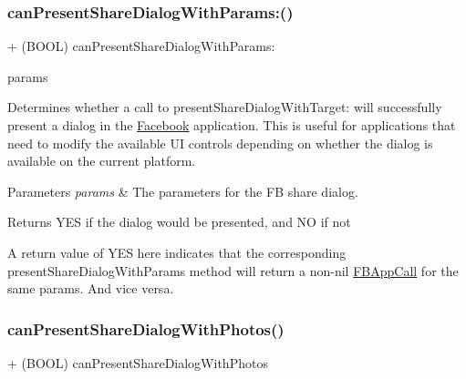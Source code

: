 \subsubsection{\texorpdfstring{can\+Present\+Share\+Dialog\+With\+Params\+:()}{canPresentShareDialogWithParams:()}\hspace{0.1cm}{\footnotesize\ttfamily [5/5]}}
{\footnotesize\ttfamily + (B\+O\+OL) can\+Present\+Share\+Dialog\+With\+Params\+: \begin{DoxyParamCaption}\item[{(\hyperlink{interfaceFBLinkShareParams}{F\+B\+Link\+Share\+Params} $\ast$)}]{params }\end{DoxyParamCaption}}

Determines whether a call to present\+Share\+Dialog\+With\+Target\+: will successfully present a dialog in the \hyperlink{interfaceFacebook}{Facebook} application. This is useful for applications that need to modify the available UI controls depending on whether the dialog is available on the current platform.


\begin{DoxyParams}{Parameters}
{\em params} & The parameters for the FB share dialog.\\
\hline
\end{DoxyParams}
\begin{DoxyReturn}{Returns}
Y\+ES if the dialog would be presented, and NO if not
\end{DoxyReturn}
A return value of Y\+ES here indicates that the corresponding present\+Share\+Dialog\+With\+Params method will return a non-\/nil \hyperlink{interfaceFBAppCall}{F\+B\+App\+Call} for the same params. And vice versa. \mbox{\label{interfaceFBDialogs_a16156d6a4664e4ea55e351bc78b6e8a7}} 
\subsubsection{\texorpdfstring{can\+Present\+Share\+Dialog\+With\+Photos()}{canPresentShareDialogWithPhotos()}\hspace{0.1cm}{\footnotesize\ttfamily [1/5]}}
{\footnotesize\ttfamily + (B\+O\+OL) can\+Present\+Share\+Dialog\+With\+Photos \begin{DoxyParamCaption}{ }\end{DoxyParamCaption}}

